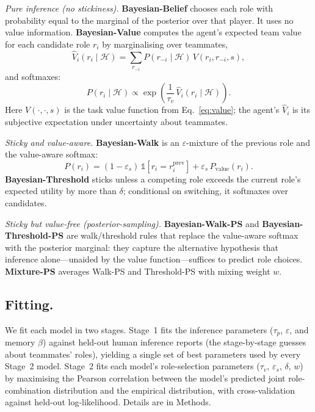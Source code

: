\documentclass[9pt,twocolumn,twoside]{pnas-new}
\begin{document}
\emph{Pure inference (no stickiness).}
\textbf{Bayesian-Belief} chooses each role with probability equal to
the marginal of the posterior over that player. It uses no value
information.
\textbf{Bayesian-Value} computes the agent's expected team value for
each candidate role $r_i$ by marginalising over teammates,
\begin{equation}
\hat V_i(r_i \mid \mathcal{H}) = \sum_{r_{-i}} P(r_{-i}\mid \mathcal{H})\,
V(r_i, r_{-i}, s),
\end{equation}
and softmaxes:
\begin{equation}
P(r_i \mid \mathcal{H}) \propto \exp\!\left(\frac{1}{\tau_v}\,
\hat V_i(r_i \mid \mathcal{H})\right).
\end{equation}
Here $V(\cdot,\cdot,s)$ is the task value function from
Eq.~\ref{eq:value}; the agent's $\hat V_i$ is its subjective expectation
under uncertainty about teammates.

\emph{Sticky and value-aware.}
\textbf{Bayesian-Walk} is an $\varepsilon$-mixture of the previous role
and the value-aware softmax:
\begin{equation}
P(r_i) = (1-\varepsilon_s)\,\mathbb{1}[r_i = r_i^{\text{prev}}]
+ \varepsilon_s\,P_{\text{value}}(r_i).
\end{equation}
\textbf{Bayesian-Threshold} sticks unless a competing role exceeds the
current role's expected utility by more than $\delta$; conditional on
switching, it softmaxes over candidates.

\emph{Sticky but value-free (posterior-sampling).}
\textbf{Bayesian-Walk-PS} and \textbf{Bayesian-Threshold-PS} are
walk/threshold rules that replace the value-aware softmax with the
posterior marginal: they capture the alternative hypothesis that
inference alone---unaided by the value function---suffices to predict
role choices. \textbf{Mixture-PS} averages Walk-PS and Threshold-PS
with mixing weight $w$.

\subsection*{Fitting.} We fit each model in two stages. Stage~1 fits
the inference parameters ($\tau_p$, $\varepsilon$, and memory $\beta$)
against held-out human inference reports (the stage-by-stage guesses
about teammates' roles), yielding a single set of best parameters used
by every Stage~2 model. Stage~2 fits each model's role-selection
parameters ($\tau_v$, $\varepsilon_s$, $\delta$, $w$) by maximising the
Pearson correlation between the model's predicted joint
role-combination distribution and the empirical distribution, with
cross-validation against held-out log-likelihood. Details are in
Methods.
\end{document}
